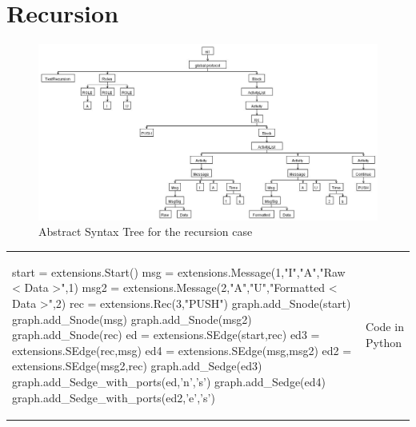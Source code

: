 \documentclass[a4paper,11pt,twoside]{report}
\begin{document}
\section{Recursion}
\begin{figure}[h]
\begin{center}
\includegraphics[width=18cm]{recursionAST}\caption{Abstract Syntax Tree for the recursion case}
\end{center}
\label{fig:RecursionAST}
\end{figure}
\begin{tabular}{ll}
\begin{SJLISTING}
start = extensions.Start()
msg = extensions.Message(1,"I","A","Raw < Data >",1)
msg2 = extensions.Message(2,"A","U","Formatted < Data >",2)
rec = extensions.Rec(3,"PUSH")
graph.add_Snode(start)
graph.add_Snode(msg)
graph.add_Snode(msg2)
graph.add_Snode(rec)
ed = extensions.SEdge(start,rec)
ed3 = extensions.SEdge(rec,msg)
ed4 = extensions.SEdge(msg,msg2)
ed2 = extensions.SEdge(msg2,rec)
graph.add_Sedge(ed3)
graph.add_Sedge_with_ports(ed,'n','s')
graph.add_Sedge(ed4)
graph.add_Sedge_with_ports(ed2,'e','s')
\end{SJLISTING}
&  Code in Python
\end{tabular}
\end{document}

